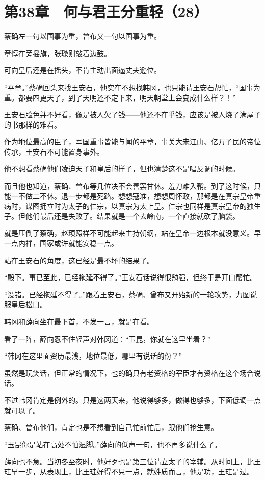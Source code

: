 \section{第38章　何与君王分重轻（28）}

蔡确左一句以国事为重，曾布又一句以国事为重。

章惇在旁摇旗，张璪则敲着边鼓。

可向皇后还是在摇头，不肯主动出面逼丈夫逊位。

“平章。”蔡确回头来找王安石，他实在不想找韩冈，也只能请王安石帮忙，“国事为重。都要四更天了，到了天明还不定下来，明天朝堂上会变成什么样？！”

王安石脸色并不好看，像是被人欠了钱——他还不在乎钱，应该是被人烧了满屋子的书那样的难看。

作为地位最高的臣子，军国重事皆能与闻的平章，事关大宋江山、亿万子民的帝位传承，王安石不可能置身事外。

他不想看蔡确他们凌迫天子和皇后的样子，但也清楚这不是唱反调的时候。

而且他也知道，蔡确、曾布等几位决不会善罢甘休。羞刀难入鞘。到了这时候，只能一不做二不休。退一步都是死路。想想寇准，想想周怀政，那都是在真宗皇帝重病时，谋图拥立时为太子的仁宗，以真宗为太上皇。仁宗也同样是真宗皇帝的独生子。但他们最后还是失败了。结果就是一个去岭南，一个直接就砍了脑袋。

就是压倒了蔡确，赵顼照样不可能起来主持朝纲，站在皇帝一边根本就没意义。早一点内禅，国家或许就能安稳一点。

站在王安石的角度，这已经是最不坏的结果了。

“殿下。事已至此，已经拖延不得了。”王安石话说得很勉强，但终于是开口帮忙。

“没错。已经拖延不得了。”跟着王安石，蔡确、曾布又开始新的一轮攻势，力图说服皇后松口。

韩冈和薛向坐在最下首，不发一言，就是在看。

看了一阵，薛向忍不住轻声对韩冈道：“玉昆，你就在这里坐着？”

“韩冈在这里面资历最浅，地位最低，哪里有说话的份？”

虽然是玩笑话，但正常的情况下，也的确只有老资格的宰臣才有资格在这个场合说话。

不过韩冈肯定是例外的。只是这两天来，他说得够多，做得也够多，下面低调一点就可以了。

蔡确、曾布他们，肯定也是不想看到自己忙前忙后，跟他们抢生意。

“玉昆你是站在高处不怕湿脚。”薛向的低声一句，也不再多说什么了。

薛向也不急。当初冬至夜时，他好歹也是第三位请立太子的宰辅。从时间上，比王珪早一步，从表现上，比王珪好得不只一点，就姓质而言，他是功，王珪是过。

